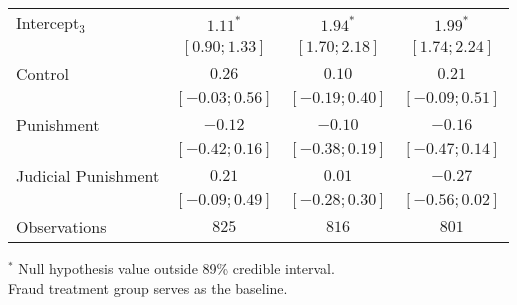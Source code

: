 \begin{table}[h]
\begin{center}
\begin{threeparttable}
\begin{tabular}{l c c c}
Intercept$_3$       & $1.11^{*}$        & $1.94^{*}$        & $1.99^{*}$        \\
                    & $ [ 0.90;  1.33]$ & $ [ 1.70;  2.18]$ & $ [ 1.74;  2.24]$ \\
Control             & $0.26$            & $0.10$            & $0.21$            \\
                    & $ [-0.03;  0.56]$ & $ [-0.19;  0.40]$ & $ [-0.09;  0.51]$ \\
Punishment          & $-0.12$           & $-0.10$           & $-0.16$           \\
                    & $ [-0.42;  0.16]$ & $ [-0.38;  0.19]$ & $ [-0.47;  0.14]$ \\
Judicial Punishment & $0.21$            & $0.01$            & $-0.27$           \\
                    & $ [-0.09;  0.49]$ & $ [-0.28;  0.30]$ & $ [-0.56;  0.02]$ \\
\hline
Observations        & $825$             & $816$             & $801$             \\
\hline
\end{tabular}
\begin{tablenotes}[flushleft]
\scriptsize{$^*$ Null hypothesis value outside 89\% credible interval.  \\
Fraud treatment group serves as the baseline.}
\end{tablenotes}
\end{threeparttable}
\label{table:coefficients}
\end{center}
\end{table}
